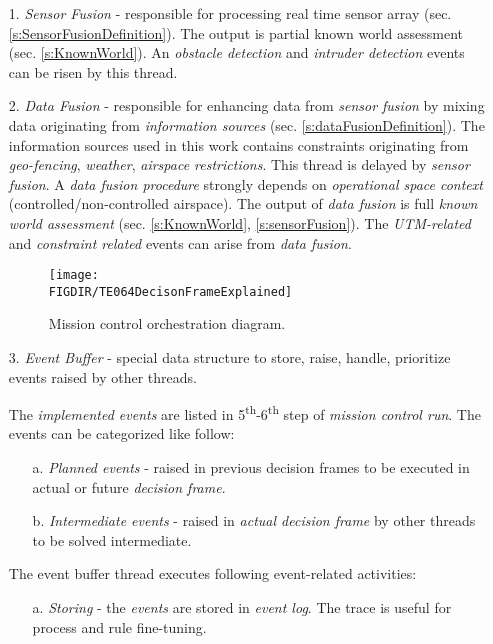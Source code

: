 \begin{itemize}
    \item[1.] \emph{Sensor Fusion} - responsible for processing real time sensor array (sec. \ref{s:SensorFusionDefinition}). The output is partial known world assessment (sec. \ref{s:KnownWorld}). An \emph{obstacle detection} and \emph{intruder detection} events can be risen by this thread. 
    
    \item[2.] \emph{Data Fusion} - responsible for enhancing data from \emph{sensor fusion} by mixing data originating from \emph{information sources} (sec. \ref{s:dataFusionDefinition}). The information sources used in this work contains constraints originating from \emph{geo-fencing}, \emph{weather}, \emph{airspace restrictions}. This thread is delayed by \emph{sensor fusion}. A \emph{data fusion procedure} strongly depends on \emph{operational space context} (controlled/non-controlled airspace). The output of \emph{data fusion} is full \emph{known world assessment} (sec. \ref{s:KnownWorld}, \ref{s:sensorFusion}). The \emph{UTM-related} and \emph{constraint related} events can arise from \emph{data fusion}.
    
    
\begin{figure}[H]
    \centering
    \texttt{[image: \\FIGDIR/TE064DecisonFrameExplained]}
    \caption{Mission control orchestration diagram.}
    \label{fig:misisonControlRunOrchestrationDiagram}
\end{figure}

    \item[3.] \emph{Event Buffer} -  special data structure to store, raise, handle, prioritize events raised by other threads. 
    
    The \emph{implemented events} are listed in 5\textsuperscript{th}-6\textsuperscript{th} step of \emph{mission control run}. The events can be categorized like follow:
    \begin{itemize}
        \item[a.] \emph{Planned events} - raised in previous decision frames to be executed in actual or future \emph{decision frame}. 
        
        \item[b.] \emph{Intermediate events} - raised in \emph{actual decision frame} by other threads to be solved intermediate. 
    \end{itemize}
    
    The event buffer thread executes following event-related activities:
    \begin{itemize}
        \item[a.] \emph{Storing} - the \emph{events} are stored in \emph{event log}. The trace is useful for process and rule fine-tuning. 
        

\end{itemize}
\end{itemize}
